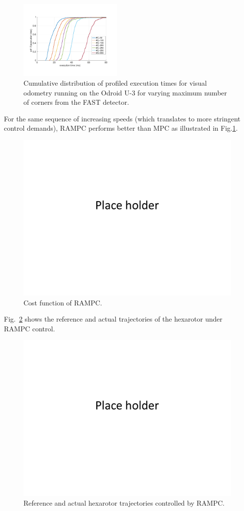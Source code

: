 \begin{figure}[htbp]
  \centering
  \includegraphics[width=0.45\textwidth]{figures/time_ecdf_millisec.pdf}
  \caption{Cumulative distribution of profiled execution times for visual odometry running on the Odroid U-3 for varying maximum number of corners from the FAST detector.}
\end{figure}

For the same sequence of increasing speeds (which translates to more stringent control demands), RAMPC performs better than MPC as illustrated in Fig.\ref{fig:RAMPCcost}.
\begin{figure}[t]
	\centering
	\includegraphics[width=0.7\linewidth]{figures/placeHolder}
	\caption{Cost function of RAMPC.}
	\label{fig:RAMPCcost}
\end{figure}

Fig.~\ref{fig:RAMPCtrajectory} shows the reference and actual trajectories of the hexarotor under RAMPC control.
\begin{figure}[t]
	\centering
	\includegraphics[width=0.7\linewidth]{figures/placeHolder}
	\caption{Reference and actual hexarotor trajectories controlled by RAMPC.}
	\label{fig:RAMPCtrajectory}
\end{figure}

